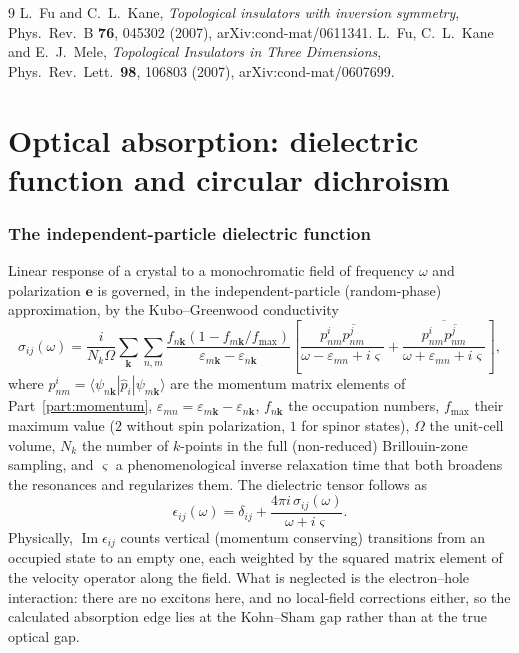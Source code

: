 \documentclass[11pt]{article}
\begin{document}
\begin{thebibliography}{9}
L.~Fu and C.~L.~Kane,
\emph{Topological insulators with inversion symmetry},
Phys.\ Rev.\ B \textbf{76}, 045302 (2007), arXiv:cond-mat/0611341.
L.~Fu, C.~L.~Kane and E.~J.~Mele,
\emph{Topological Insulators in Three Dimensions},
Phys.\ Rev.\ Lett.\ \textbf{98}, 106803 (2007), arXiv:cond-mat/0607699.
\end{thebibliography}

\part{Optical absorption: dielectric function and circular dichroism}
\label{part:optics}

\section{The independent-particle dielectric function}

Linear response of a crystal to a monochromatic field of frequency
$\omega$ and polarization $\mathbf e$ is governed, in the
independent-particle (random-phase) approximation, by the
Kubo--Greenwood conductivity
%
\begin{equation}
  \sigma_{ij}(\omega)=\frac{i}{N_k\Omega}\sum_{\mathbf k}\sum_{n,m}
  \frac{f_{n\mathbf k}\left(1-f_{m\mathbf k}/f_{\max}\right)}
       {\varepsilon_{m\mathbf k}-\varepsilon_{n\mathbf k}}
  \left[\frac{p^i_{nm}\overline{p^j_{nm}}}
             {\omega-\varepsilon_{mn}+i\varsigma}
       +\frac{\overline{p^i_{nm}\overline{p^j_{nm}}}}
             {\omega+\varepsilon_{mn}+i\varsigma}\right],
  \label{eq:optics-sigma}
\end{equation}
%
where $p^i_{nm}=\langle\psi_{n\mathbf k}|\hat p_i|\psi_{m\mathbf k}\rangle$
are the momentum matrix elements of Part~\ref{part:momentum},
$\varepsilon_{mn}=\varepsilon_{m\mathbf k}-\varepsilon_{n\mathbf k}$,
$f_{n\mathbf k}$ the occupation numbers, $f_{\max}$ their maximum value
($2$ without spin polarization, $1$ for spinor states), $\Omega$ the
unit-cell volume, $N_k$ the number of $k$-points in the full (non-reduced)
Brillouin-zone sampling, and $\varsigma$ a phenomenological inverse
relaxation time that both broadens the resonances and regularizes them.
The dielectric tensor follows as
%
\begin{equation}
  \epsilon_{ij}(\omega)=\delta_{ij}
  +\frac{4\pi i\,\sigma_{ij}(\omega)}{\omega+i\varsigma}.
  \label{eq:optics-eps}
\end{equation}
%
Physically, $\operatorname{Im}\epsilon_{ij}$ counts vertical (momentum
conserving) transitions from an occupied state to an empty one, each
weighted by the squared matrix element of the velocity operator along the
field. What is neglected is the electron--hole interaction: there are no
excitons here, and no local-field corrections either, so the calculated
absorption edge lies at the Kohn--Sham gap rather than at the true optical
gap.
\end{document}
